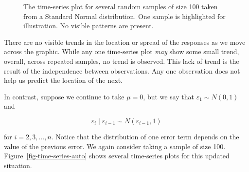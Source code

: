 \documentclass[
  letterpaper,
  DIV=11,
  numbers=noendperiod]{scrreprt}
\theoremstyle{definition}
\theoremstyle{plain}
\theoremstyle{definition}
\theoremstyle{remark}
\begin{document}
\begin{figure}


\caption{\label{fig-time-series}The time-series plot for several random
samples of size 100 taken from a Standard Normal distribution. One
sample is highlighted for illustration. No visible patterns are
present.}

\end{figure}%

There are no visible trends in the location or spread of the responses
as we move across the graphic. While any one time-series plot \emph{may}
show some small trend, overall, across repeated samples, no trend is
observed. This lack of trend is the result of the independence between
observations. Any one observation does not help us predict the location
of the next.

In contrast, suppose we continue to take \(\mu = 0\), but we say that
\(\varepsilon_1 \sim N(0, 1)\) and

\[\varepsilon_i \mid \varepsilon_{i-1} \sim N\left(\varepsilon_{i-1}, 1\right)\]

for \(i = 2, 3, \dotsc, n\). Notice that the distribution of one error
term depends on the value of the previous error. We again consider
taking a sample of size 100. Figure~\ref{fig-time-series-auto} shows
several time-series plots for this updated situation.
\end{document}
